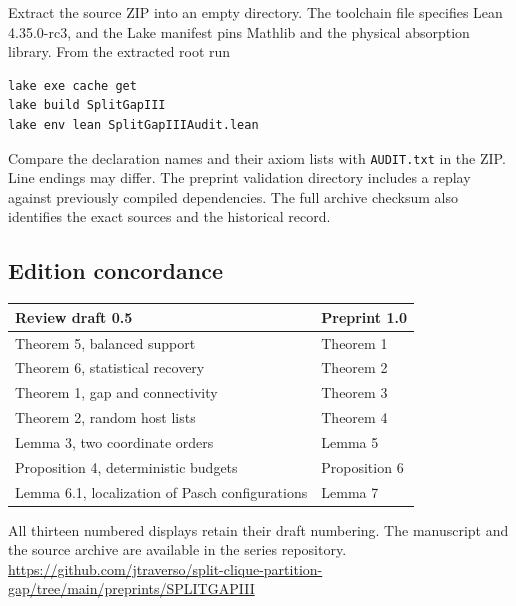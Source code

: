 \documentclass[english,11pt,a4paper]{article}
\newcounter{none}
\begin{document}
Extract the source ZIP into an empty directory. The toolchain file specifies Lean 4.35.0-rc3, and the Lake manifest pins Mathlib and the physical absorption library. From the extracted root run

\begin{verbatim}
lake exe cache get
lake build SplitGapIII
lake env lean SplitGapIIIAudit.lean
\end{verbatim}

Compare the declaration names and their axiom lists with \texttt{AUDIT.txt} in the ZIP. Line endings may differ. The preprint validation directory includes a replay against previously compiled dependencies. The full archive checksum also identifies the exact sources and the historical record.

\subsection{Edition concordance}\label{edition-concordance}

{\def\LTcaptype{none} %
\begin{longtable}[]{@{}ll@{}}
\toprule\noalign{}
Review draft 0.5 & Preprint 1.0 \\
\midrule\noalign{}
\endhead
\bottomrule\noalign{}
\endlastfoot
Theorem 5, balanced support & Theorem 1 \\
Theorem 6, statistical recovery & Theorem 2 \\
Theorem 1, gap and connectivity & Theorem 3 \\
Theorem 2, random host lists & Theorem 4 \\
Lemma 3, two coordinate orders & Lemma 5 \\
Proposition 4, deterministic budgets & Proposition 6 \\
Lemma 6.1, localization of Pasch configurations & Lemma 7 \\
\end{longtable}
}

All thirteen numbered displays retain their draft numbering. The manuscript and the source archive are available in the series repository. \url{https://github.com/jtraverso/split-clique-partition-gap/tree/main/preprints/SPLITGAPIII}
\end{document}
